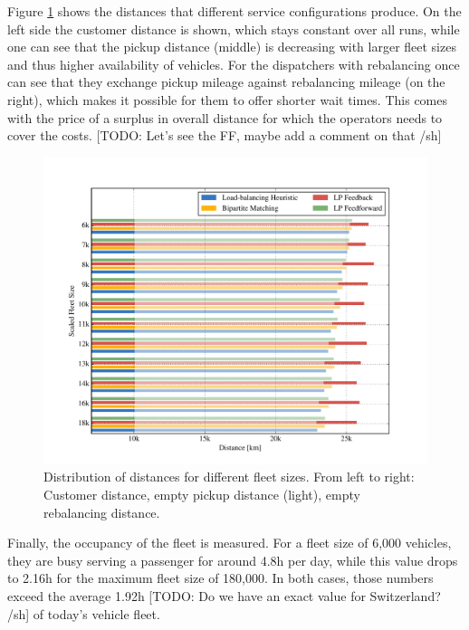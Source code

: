 
Figure \ref{fig:distances} shows the distances that different service configurations
produce. On the left side the customer distance is shown, which stays constant
over all runs, while one can see that the pickup distance (middle) is decreasing
with larger fleet sizes and thus higher availability of vehicles. For the dispatchers
with rebalancing once can see that they exchange pickup mileage against rebalancing
mileage (on the right), which makes it possible for them to offer shorter wait
times. This comes with the price of a surplus in overall distance for which the
operators needs to cover the costs. [TODO: Let's see the FF, maybe add a comment
on that /sh]

\begin{figure}
\includegraphics[width=1.0\textwidth]{figures/distances.pdf}
\caption{Distribution of distances for different fleet sizes. From left to right:
Customer distance, empty pickup distance (light), empty rebalancing distance.}
\label{fig:distances}
\end{figure}

Finally, the occupancy of the fleet is measured. For a fleet size of 6,000
vehicles, they are busy serving a passenger for around 4.8h per day, while
this value drops to 2.16h for the maximum fleet size of 180,000. In both cases,
those numbers exceed the average 1.92h [TODO: Do we have an exact value for Switzerland? /sh] of today's vehicle fleet.

